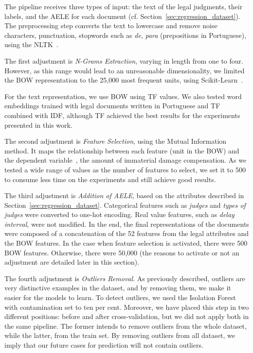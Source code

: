 The pipeline receives three types of input: the text of the legal judgments, their labels, and the \gls{AELE} for each document (cf. Section~\ref{sec:regression_dataset}).
The preprocessing step converts the text to lowercase and remove noise characters, punctuation, stopwords such as \textit{de}, \textit{para} (prepositions in Portuguese), using the \gls{NLTK}~\cite{bird:2004}.

The first adjustment is \emph{N-Grams Extraction}, varying in length from one to four. However, as this range would lead to an unreasonable dimensionality, we limited the BOW representation to the 25,000 most frequent units, using Scikit-Learn~\cite{Pedregosa2012}.


For the text representation, we use \gls{BOW} using \gls{TF} values. We also tested word embeddings trained with legal documents written in Portuguese and \gls{TF} combined with \gls{IDF}, although TF achieved the best results for the experiments presented in this work. 


The second adjustment is \emph{Feature Selection}, using the Mutual Information method. It maps the relationship between each feature (unit in the BOW) and the dependent variable~\cite{Cover2005}, the amount of immaterial damage compensation. As we tested a wide range of values as the number of features to select, we set it to 500 to consume less time on the experiments and still achieve good results.

The third adjustment is \emph{Addition of \gls{AELE}}, based on the attributes described in Section~\ref{sec:regression_dataset}. Categorical features such as \textit{judges} and \textit{types of judges} were converted to one-hot encoding. Real value features, such as \textit{delay interval}, were not modified. 
In the end, the final representations of the documents were composed of a concatenation of the 52 features from the legal attributes and the \gls{BOW} features. In the case when feature selection is activated, there were 500 \gls{BOW} features. Otherwise, there were 50,000 (the reasons to activate or not an adjustment are detailed later in this section).

The fourth adjustment is \emph{Outliers Removal}. As previously described, outliers are very distinctive examples in the dataset, and by removing them, we make it easier for the models to learn. To detect outliers, we used the Isolation Forest with contamination set to ten per cent. Moreover, we have placed this step in two different positions: before and after cross-validation, but we did not apply both in the same pipeline. The former intends to remove outliers from the whole dataset, while the latter, from the train set. By removing outliers from all dataset, we imply that our future cases for prediction will not contain outliers. 


